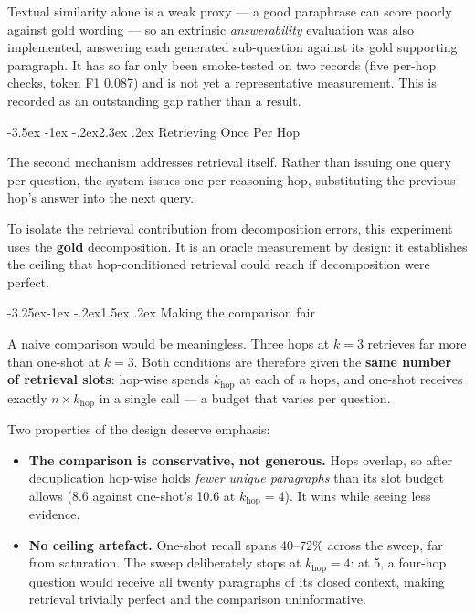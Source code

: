 \documentclass[11pt,a4paper]{article}
\makeatletter
\renewcommand\section{\@startsection{section}{1}{\z@}%
  {-3.5ex \@plus -1ex \@minus -.2ex}{2.3ex \@plus.2ex}%
  {\color{ink}\normalfont\Large\bfseries}}
\renewcommand\subsection{\@startsection{subsection}{2}{\z@}%
  {-3.25ex\@plus -1ex \@minus -.2ex}{1.5ex \@plus .2ex}%
  {\color{accent}\normalfont\large\bfseries}}
\makeatother
\begin{document}
Textual similarity alone is a weak proxy --- a good paraphrase can score poorly
against gold wording --- so an extrinsic \emph{answerability} evaluation was also
implemented, answering each generated sub-question against its gold supporting
paragraph. It has so far only been smoke-tested on two records (five per-hop
checks, token F1 0.087) and is not yet a representative measurement. This is
recorded as an outstanding gap rather than a result.

\section{Retrieving Once Per Hop}

The second mechanism addresses retrieval itself. Rather than issuing one query
per question, the system issues one per reasoning hop, substituting the previous
hop's answer into the next query.

To isolate the retrieval contribution from decomposition errors, this experiment
uses the \textbf{gold} decomposition. It is an oracle measurement by design: it
establishes the ceiling that hop-conditioned retrieval could reach if
decomposition were perfect.

\subsection{Making the comparison fair}

A naive comparison would be meaningless. Three hops at $k=3$ retrieves far more
than one-shot at $k=3$. Both conditions are therefore given the \textbf{same
number of retrieval slots}: hop-wise spends $k_{\text{hop}}$ at each of
$n$ hops, and one-shot receives exactly $n \times k_{\text{hop}}$ in a single
call --- a budget that varies per question.

Two properties of the design deserve emphasis:

\begin{itemize}
  \item \textbf{The comparison is conservative, not generous.} Hops overlap, so
        after deduplication hop-wise holds \emph{fewer unique paragraphs} than
        its slot budget allows (8.6 against one-shot's 10.6 at
        $k_{\text{hop}}=4$). It wins while seeing less evidence.
  \item \textbf{No ceiling artefact.} One-shot recall spans 40--72\% across the
        sweep, far from saturation. The sweep deliberately stops at
        $k_{\text{hop}}=4$: at 5, a four-hop question would receive all twenty
        paragraphs of its closed context, making retrieval trivially perfect and
        the comparison uninformative.
\end{itemize}
\end{document}
